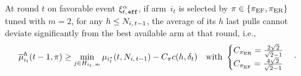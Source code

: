 \begin{lemma}
\label{lem:core-eff}
At round $t$ on favorable event $\xi^\alpha_{t,\, \texttt{eff}}$, if arm~$i_{t}$ is selected by $\pi \in \left\{\normalfont \pi_{\rm EF}, \normalfont \pi_{\rm ER}\right\}$ tuned with $m=2$, for any $h \leq N_{i,\,t-1}$,  the average of its $h$ last pulls cannot deviate significantly from the best available arm at that round, i.e.,
\begin{equation*}
\overline{\mu}^{h}_{i_t}(t-1,\pi) \geq \min_{j \in H_{i_t,\,m}} \mu_{i^\star_t}(t,N_{i,\,t-1})- C_\pi c(h, \delta_t) \quad \text{with } 
\begin{cases}
C_{\normalfont \pi_{\rm ER}} = \frac{2\sqrt{2}}{\sqrt{2}-1}\\
C_{\normalfont \pi_{\rm EF}} = \frac{4\sqrt{2}}{\sqrt{2}-1}
\end{cases}\cdot
\end{equation*}
\end{lemma}

